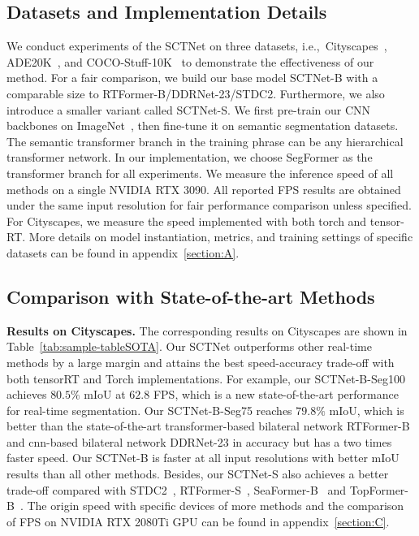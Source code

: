 \documentclass[letterpaper]{article} %
\begin{document}
\subsection{Datasets and Implementation Details}
We conduct experiments of the SCTNet on three datasets, i.e.,~Cityscapes~\cite{cordts2016cityscapes}, ADE20K~\cite{zhou2017scene}, and COCO-Stuff-10K~\cite{caesar2018coco} to demonstrate the effectiveness of our method. For a fair comparison, we build our base model SCTNet-B with a comparable size to RTFormer-B/DDRNet-23/STDC2. Furthermore, we also introduce a smaller variant called SCTNet-S. We first pre-train our CNN backbones on ImageNet~\cite{deng2009imagenet}, then fine-tune it on semantic segmentation datasets.
The semantic transformer branch in the training phrase can be any hierarchical transformer network.
In our implementation, we choose SegFormer as the transformer branch for all experiments.
We measure the inference speed of all methods on a single NVIDIA RTX 3090.
All reported FPS results are obtained under the same input resolution for fair performance comparison unless specified.
For Cityscapes, we measure the speed implemented with both torch and tensor-RT. More details on model instantiation, metrics, and training settings of specific datasets can be found in appendix~\ref{section:A}.

\subsection{Comparison with State-of-the-art Methods}


\noindent
{\bf Results on Cityscapes.} The corresponding results on Cityscapes\cite{cordts2016cityscapes} are shown in Table~\ref{tab:sample-tableSOTA}. Our SCTNet outperforms other real-time methods by a large margin and attains the best speed-accuracy trade-off with both tensorRT and Torch implementations. For example, our SCTNet-B-Seg100 achieves $80.5\%$ mIoU at $62.8$ FPS, which is a new state-of-the-art performance for real-time segmentation. Our SCTNet-B-Seg75 reaches $79.8\%$ mIoU, which is better than the state-of-the-art transformer-based bilateral network RTFormer-B and cnn-based bilateral network DDRNet-23 in accuracy but has a two times faster speed. Our SCTNet-B is faster at all input resolutions with better mIoU results than all other methods. Besides, our SCTNet-S also achieves a better trade-off compared with STDC2~\cite{fan2021rethinking}, RTFormer-S~\cite{wang2022rtformer}, SeaFormer-B~\cite{wan2023seaformer} and TopFormer-B~\cite{zhang2022topformer}. The origin speed with specific devices of more methods and the comparison of FPS on NVIDIA RTX 2080Ti GPU can be found in appendix~\ref{section:C}.
\end{document}

